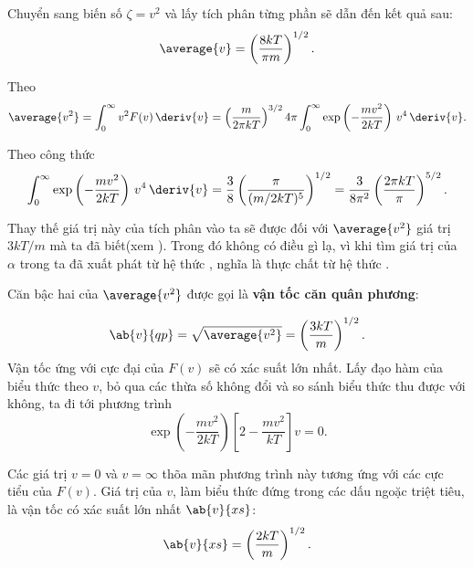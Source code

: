 \noindent
Chuyển sang biến số $\zeta=v^2$ và lấy tích phân từng phần sẽ dẫn đến kết quả sau:
\begin{equation}\label{eq:11_65}
	\average{v} = \left(\frac{8kT}{\pi m}\right)^{1/2}.
\end{equation}

Theo 
\begin{equation}\label{eq:11_66}
	\average{v^2} = \int_{0}^{\infty} v^2F(v)\,\deriv{v} = \left(\frac{m}{2\pi kT}\right)^{3/2} 4\pi \int_{0}^{\infty} \exp\left(-\frac{mv^2}{2kT}\right)\,v^4\,\deriv{v}.
\end{equation}

\noindent
Theo công thức 
\begin{equation*}
	\int_{0}^{\infty} \exp\left(-\frac{mv^2}{2kT}\right)\,v^4\,\deriv{v} = \frac{3}{8} \left(\frac{\pi}{(m/2kT)^5}\right)^{1/2} = \frac{3}{8\pi^2}\left(\frac{2\pi kT}{\pi}\right)^{5/2}.
\end{equation*}

\noindent

Thay thế giá trị này của tích phân vào  ta sẽ được đối với $\average{v^2}$ giá trị $3kT/m$ mà ta đã biết(xem ). Trong đó không có điều gì lạ, vì khi tìm giá trị của $\alpha$ trong  ta đã xuất phát từ hệ thức , nghĩa là thực chất từ hệ thức .

Căn bậc hai của $\average{v^2}$ được gọi là \textbf{vận tốc căn quân phương}:

\begin{equation}\label{eq:11_67}
	\ab{v}{qp} = \sqrt{\average{v^2}} = \left(\frac{3kT}{m}\right)^{1/2}.
\end{equation}
Vận tốc ứng với cực đại của $F(v)$ sẽ có xác suất lớn nhất. Lấy đạo hàm của biểu thức  theo $v$, bỏ qua các thừa số không đổi và so sánh biểu thức thu được với không, ta đi tới phương trình
\begin{equation*}
	\exp\left(-\frac{mv^2}{2kT}\right)\left[2 - \frac{mv^2}{kT}\right] v = 0.
\end{equation*}

\noindent
Các giá trị $v=0$ và $v=\infty$ thõa mãn phương trình này tương ứng với các cực tiểu của $F(v)$. Giá trị của $v$, làm biểu thức đứng trong các dấu ngoặc triệt tiêu, là vận tốc có xác suất lớn nhất $\ab{v}{xs}$:
\begin{equation}\label{eq:11_68}
	\ab{v}{xs} = \left(\frac{2kT}{m}\right)^{1/2}.
\end{equation}


